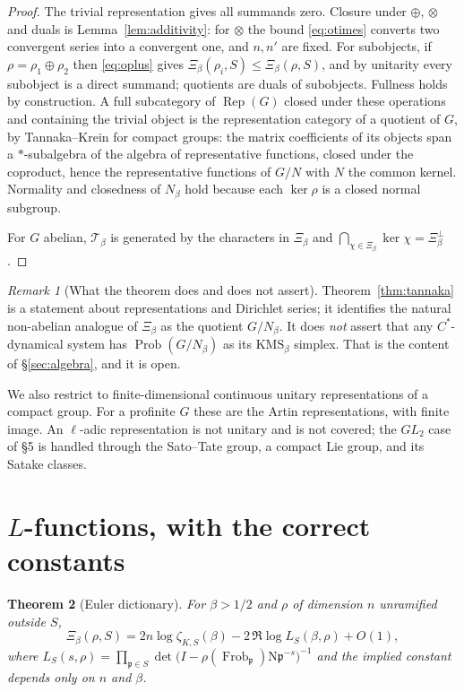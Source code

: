 \documentclass[11pt]{amsart}
\numberwithin{equation}{section}
\newtheorem{theorem}{Theorem}[section]
\theoremstyle{definition}
\theoremstyle{remark}
\newtheorem{remark}[theorem]{Remark}
\newcommand{\cT}{\mathcal{T}}
\newcommand{\pp}{\mathfrak{p}}
\newcommand{\Ns}{\mathrm{N}}
\newcommand{\Frob}{\operatorname{Frob}}
\newcommand{\Rep}{\operatorname{Rep}}
\newcommand{\Prob}{\operatorname{Prob}}
\begin{document}
\begin{proof}
The trivial representation gives all summands zero. Closure under $\oplus$, $\otimes$ and
duals is Lemma~\ref{lem:additivity}: for $\otimes$ the bound \eqref{eq:otimes} converts two
convergent series into a convergent one, and $n,n'$ are fixed. For subobjects, if
$\rho=\rho_1\oplus\rho_2$ then \eqref{eq:oplus} gives
$\Xi_\beta(\rho_i,S)\le\Xi_\beta(\rho,S)$, and by unitarity every subobject is a direct
summand; quotients are duals of subobjects. Fullness holds by construction. A full
subcategory of $\Rep(G)$ closed under these operations and containing the trivial object is
the representation category of a quotient of $G$, by Tannaka--Krein for compact groups: the
matrix coefficients of its objects span a $*$-subalgebra of the algebra of representative
functions, closed under the coproduct, hence the representative functions of $G/N$ with $N$
the common kernel. Normality and closedness of $N_\beta$ hold because each $\ker\rho$ is a
closed normal subgroup.

For $G$ abelian, $\cT_\beta$ is generated by the characters in $\Xi_\beta$ and
$\bigcap_{\chi\in\Xi_\beta}\ker\chi=\Xi_\beta^\perp$.
\end{proof}

\begin{remark}[What the theorem does and does not assert]\label{rem:tannakawarn}
Theorem~\ref{thm:tannaka} is a statement about representations and Dirichlet series; it
identifies the natural non-abelian analogue of $\Xi_\beta$ as the quotient $G/N_\beta$. It
does \emph{not} assert that any $C^*$-dynamical system has $\Prob(G/N_\beta)$ as its
$\mathrm{KMS}_\beta$ simplex. That is the content of \S\ref{sec:algebra}, and it is open.

We also restrict to finite-dimensional continuous unitary representations of a compact
group. For a profinite $G$ these are the Artin representations, with finite image. An
$\ell$-adic representation is not unitary and is not covered; the $GL_2$ case of \S5 is
handled through the Sato--Tate group, a compact Lie group, and its Satake classes.
\end{remark}

\section{$L$-functions, with the correct constants}\label{sec:L}

\begin{theorem}[Euler dictionary]\label{thm:euler}
For $\beta>1/2$ and $\rho$ of dimension $n$ unramified outside $S$,
\begin{equation}\label{eq:euler}
\Xi_\beta(\rho,S)=2n\log\zeta_{K,S}(\beta)-2\,\Re\log L_S(\beta,\rho)+O(1),
\end{equation}
where $L_S(s,\rho)=\prod_{\pp\in S}\det\bigl(I-\rho(\Frob_\pp)\Ns\pp^{-s}\bigr)^{-1}$ and the
implied constant depends only on $n$ and $\beta$.
\end{theorem}
\end{document}
